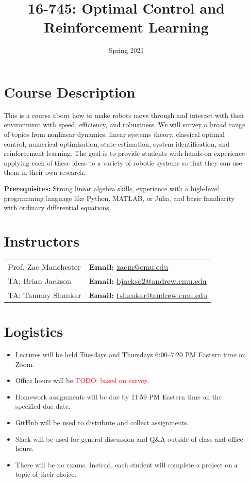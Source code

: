 \documentclass[11pt,letterpaper]{article}
\title{16-745: Optimal Control and Reinforcement Learning}
\author{Spring 2021}
\date{}
\newcommand{\todo}[1]{\textcolor{red}{TODO: #1}}
\begin{document}
\maketitle

\section*{Course Description}

This is a course about how to make robots move through and interact with their environment with speed, efficiency, and robustness. We will survey a broad range of topics from nonlinear dynamics, linear systems theory, classical optimal control, numerical optimization, state estimation, system identification, and reinforcement learning. The goal is to provide students with hands-on experience applying each of these ideas to a variety of robotic systems so that they can use them in their own research.

\medskip
\noindent
\textbf{Prerequisites:} Strong linear algebra skills, experience with a high-level programming language like Python, MATLAB, or Julia, and basic familiarity with ordinary differential equations.

\section*{Instructors}

\begin{center}
\begin{tabular}{l l}
	Prof. Zac Manchester & \textbf{Email:} \href{mailto:zacm@cmu.edu}{zacm@cmu.edu} \\
	TA: Brian Jackson & \textbf{Email:} \href{mailto:bjackso2@andrew.cmu.edu}{bjackso2@andrew.cmu.edu}
	\\
	TA: Tanmay Shankar & \textbf{Email:} \href{mailto:tshankar@andrew.cmu.edu}{tshankar@andrew.cmu.edu}
\end{tabular}
\end{center}

\section*{Logistics}

\begin{itemize}
	\item Lectures will be held Tuesdays and Thursdays 6:00--7:20 PM Eastern time on Zoom.
	\item Office hours will be \todo{based on survey}.
	\item Homework assignments will be due by 11:59 PM Eastern time on the specified due date.
	\item GitHub will be used to distribute and collect assignments.
	\item Slack will be used for general discussion and Q\&A outside of class and office hours.
	\item There will be no exams. Instead, each student will complete a project on a topic of their choice.
\end{itemize}
\end{document}
